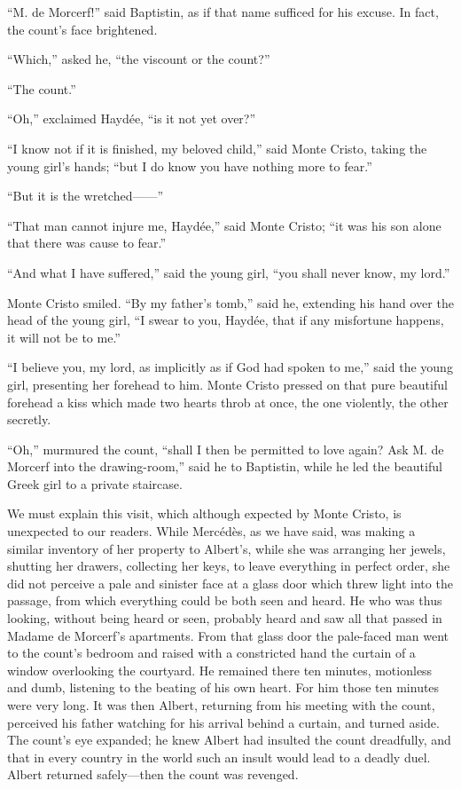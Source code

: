 “M. de Morcerf!” said Baptistin, as if that name sufficed for his
excuse. In fact, the count’s face brightened.

“Which,” asked he, “the viscount or the count?”

“The count.”

“Oh,” exclaimed Haydée, “is it not yet over?”

“I know not if it is finished, my beloved child,” said Monte Cristo,
taking the young girl’s hands; “but I do know you have nothing more to
fear.”

“But it is the wretched——”

“That man cannot injure me, Haydée,” said Monte Cristo; “it was his son
alone that there was cause to fear.”

“And what I have suffered,” said the young girl, “you shall never know,
my lord.”

Monte Cristo smiled. “By my father’s tomb,” said he, extending his hand
over the head of the young girl, “I swear to you, Haydée, that if any
misfortune happens, it will not be to me.”

“I believe you, my lord, as implicitly as if God had spoken to me,”
said the young girl, presenting her forehead to him. Monte Cristo
pressed on that pure beautiful forehead a kiss which made two hearts
throb at once, the one violently, the other secretly.

“Oh,” murmured the count, “shall I then be permitted to love again? Ask
M. de Morcerf into the drawing-room,” said he to Baptistin, while he
led the beautiful Greek girl to a private staircase.

We must explain this visit, which although expected by Monte Cristo, is
unexpected to our readers. While Mercédès, as we have said, was making
a similar inventory of her property to Albert’s, while she was
arranging her jewels, shutting her drawers, collecting her keys, to
leave everything in perfect order, she did not perceive a pale and
sinister face at a glass door which threw light into the passage, from
which everything could be both seen and heard. He who was thus looking,
without being heard or seen, probably heard and saw all that passed in
Madame de Morcerf’s apartments. From that glass door the pale-faced man
went to the count’s bedroom and raised with a constricted hand the
curtain of a window overlooking the courtyard. He remained there ten
minutes, motionless and dumb, listening to the beating of his own
heart. For him those ten minutes were very long. It was then Albert,
returning from his meeting with the count, perceived his father
watching for his arrival behind a curtain, and turned aside. The
count’s eye expanded; he knew Albert had insulted the count dreadfully,
and that in every country in the world such an insult would lead to a
deadly duel. Albert returned safely—then the count was revenged.

